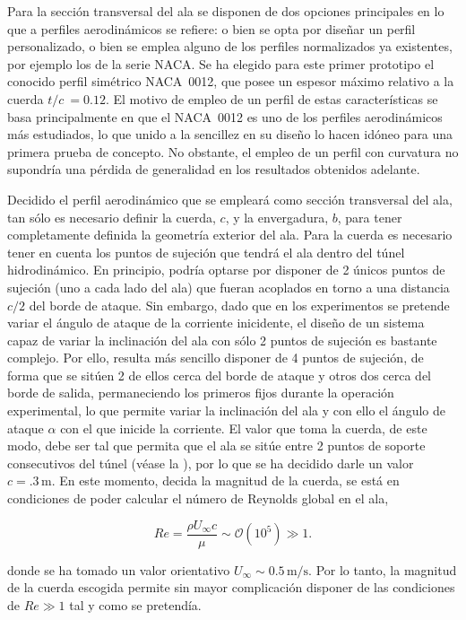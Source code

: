 Para la sección transversal del ala se disponen de dos opciones principales en lo que a perfiles aerodinámicos se refiere: o bien se opta por diseñar un perfil personalizado, o bien se emplea alguno de los perfiles normalizados ya existentes, por ejemplo los de la serie NACA. Se ha elegido para este primer prototipo el conocido perfil simétrico NACA~0012, que posee un espesor máximo relativo a la cuerda $t/c\ = 0.12$. El motivo de empleo de un perfil de estas características se basa principalmente en que el NACA~0012 es uno de los perfiles aerodinámicos más estudiados, lo que unido a la sencillez en su diseño lo hacen idóneo para una primera prueba de concepto. No obstante, el empleo de un perfil con curvatura no supondría una pérdida de generalidad en los resultados obtenidos adelante.

Decidido el perfil aerodinámico que se empleará como sección transversal del ala, tan sólo es necesario definir la cuerda, $c$, y la envergadura, $b$, para tener completamente definida la geometría exterior del ala. Para la cuerda es necesario tener en cuenta los puntos de sujeción que tendrá el ala dentro del túnel hidrodinámico. En principio, podría optarse por disponer de 2 únicos puntos de sujeción (uno a cada lado del ala) que fueran acoplados en torno a una distancia $c/2$ del borde de ataque. Sin embargo, dado que en los experimentos se pretende variar el ángulo de ataque de la corriente inicidente, el diseño de un sistema capaz de variar la inclinación del ala con sólo 2 puntos de sujeción es bastante complejo. Por ello, resulta más sencillo disponer de 4 puntos de sujeción, de forma que se sitúen 2 de ellos cerca del borde de ataque y otros dos cerca del borde de salida, permaneciendo los primeros fijos durante la operación experimental, lo que permite variar la inclinación del ala y con ello el ángulo de ataque $\alpha$ con el que inicide la corriente. El valor que toma la cuerda, de este modo, debe ser tal que permita que el ala se sitúe entre 2 puntos de soporte consecutivos del túnel (véase la ), por lo que se ha decidido darle un valor $c = .3\,\mathrm{m}$. En este momento, decida la magnitud de la cuerda,   se está en condiciones de poder calcular el número de Reynolds global en el ala, 

\begin{equation}
Re  = \dfrac{\rho U_{\infty} c}{\mu} \sim \mathcal{O}\left(10^{5}\right) \gg 1. 
\end{equation}

donde se ha tomado un valor orientativo $U_{\infty} \sim 0.5\,\mathrm{m/s}$. Por lo tanto, la magnitud de la cuerda escogida permite sin mayor complicación disponer de las condiciones de $Re \gg 1$ tal y como se pretendía. 

%





\captionsetup[figure]{textformat=period}
\endinput

